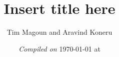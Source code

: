 \documentclass[11pt,fleqn]{article}
\begin{document}
\title{Insert title here}%
\author{Tim Magoun and Aravind Koneru}
\date{\textit{Compiled on} \today \hspace{1mm} at \currenttime}
\maketitle
\end{document}
